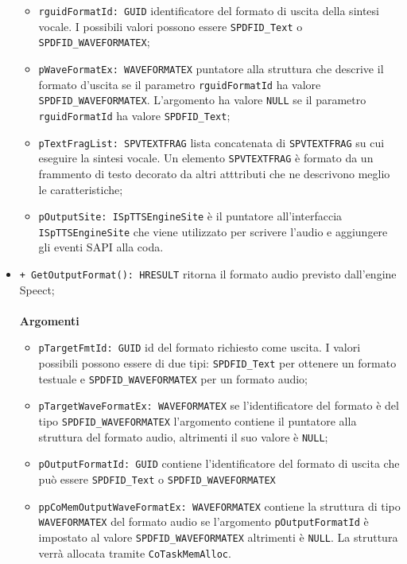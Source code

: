 \begin{itemize}
\begin{itemize}
		\item \texttt{rguidFormatId: GUID} identificatore del formato di uscita della sintesi vocale. I possibili valori possono essere \texttt{SPDFID\_Text} o\\\texttt{SPDFID\_WAVEFORMATEX};
		\item \texttt{pWaveFormatEx: WAVEFORMATEX} puntatore alla struttura che descrive il formato d'uscita se il parametro \texttt{rguidFormatId} ha valore\\\texttt{SPDFID\_WAVEFORMATEX}. L'argomento ha valore \texttt{NULL} se il parametro \texttt{rguidFormatId} ha valore \texttt{SPDFID\_Text};
		\item \texttt{pTextFragList: SPVTEXTFRAG} lista concatenata di \texttt{SPVTEXTFRAG} su cui eseguire la sintesi vocale. Un elemento \texttt{SPVTEXTFRAG} è formato da un frammento di testo decorato da altri atttributi che ne descrivono meglio le caratteristiche;
		\item \texttt{pOutputSite: ISpTTSEngineSite} è il puntatore all'interfaccia\\\texttt{ISpTTSEngineSite} che viene utilizzato per scrivere l'audio e aggiungere gli eventi SAPI alla coda.
	\end{itemize}
	\item \texttt{+ GetOutputFormat(): HRESULT} ritorna il formato audio previsto dall'engine Speect;
	\\\\
	\textbf{Argomenti}
	\begin{itemize}
		\item \texttt{pTargetFmtId: GUID} id del formato richiesto come uscita. I valori possibili possono essere di due tipi: \texttt{SPDFID\_Text} per ottenere un formato testuale e \texttt{SPDFID\_WAVEFORMATEX} per un formato audio;
		\item \texttt{pTargetWaveFormatEx: WAVEFORMATEX} se l'identificatore del formato è del tipo \texttt{SPDFID\_WAVEFORMATEX} l'argomento contiene il puntatore alla struttura del formato audio, altrimenti il suo valore è \texttt{NULL};
		\item \texttt{pOutputFormatId: GUID} contiene l'identificatore del formato di uscita che può essere \texttt{SPDFID\_Text} o \texttt{SPDFID\_WAVEFORMATEX}
		\item \texttt{ppCoMemOutputWaveFormatEx: WAVEFORMATEX} contiene la struttura di tipo \texttt{WAVEFORMATEX} del formato audio se l'argomento \texttt{pOutputFormatId} è impostato al valore \texttt{SPDFID\_WAVEFORMATEX} altrimenti è \texttt{NULL}. La struttura verrà allocata tramite \texttt{CoTaskMemAlloc}.

\end{itemize}
\end{itemize}

